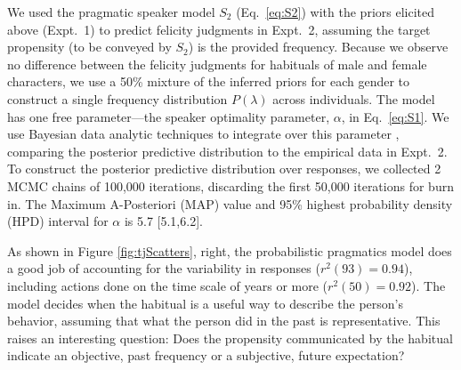 \documentclass[10pt,letterpaper]{article}
\newcommand{\ndg}[1]{\textcolor{Green}{[ndg: #1]}}
\newcommand{\mht}[1]{\textcolor{DarkOrange}{[mht: #1]}}
\begin{document}


We used the pragmatic speaker model $S_2$ (Eq.~\ref{eq:S2}) with the priors elicited above (Expt.~1) to predict felicity judgments in Expt.~2, assuming the target propensity (to be conveyed by $S_2$) is the provided frequency.
Because we observe no difference between the felicity judgments for habituals of male and female characters, we use a 50\% mixture of the inferred priors for each gender to construct a single frequency distribution $P(\lambda)$ across individuals.
The model has one free parameter---the speaker optimality parameter, $\alpha$, in Eq.~\ref{eq:S1}. 
We use Bayesian data analytic techniques to integrate over this parameter \cite{LW2014}, comparing the posterior predictive distribution to the empirical data in Expt.~2.
To construct the posterior predictive distribution over responses, we collected 2 MCMC chains of 100,000 iterations, discarding the first 50,000 iterations for burn in.
The Maximum A-Posteriori (MAP) value and 95\% highest probability density (HPD) interval for $\alpha$ is 5.7 [5.1,6.2].

As shown in Figure \ref{fig:tjScatters}, right, the probabilistic pragmatics model does a good job of accounting for the variability in responses ($r^2(93) = 0.94$), including actions done on the time scale of years or more  ($r^2(50) = 0.92$).
The model decides when the habitual is a useful way to describe the person's behavior, assuming that what the person did in the past is representative. 
This raises an interesting question: Does the propensity communicated by the habitual indicate an objective, past frequency or a subjective, future expectation?
\end{document}
